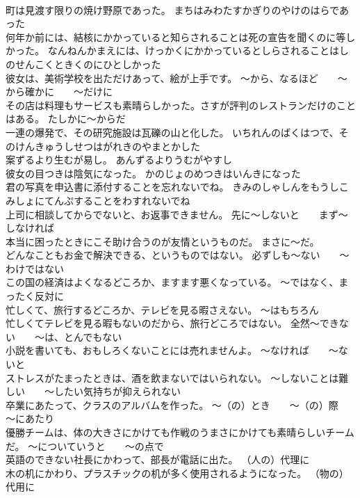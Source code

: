 \documentclass[8pt]{extreport}
\begin{document}
\begin{CJK}{UTF8}{min}
\\	町は見渡す限りの焼け野原であった。	まちはみわたすかぎりのやけのはらであった 
\\	何年か前には、結核にかかっていると知らされることは死の宣告を聞くのに等しかった。	なんねんかまえには、けっかくにかかっているとしらされることはしのせんこくときくのにひとしかった 
\\	彼女は、美術学校を出ただけあって、絵が上手です。	～から、なるほど　　～から確かに　　～だけに
\\	その店は料理もサービスも素晴らしかった。さすが評判のレストランだけのことはある。	たしかに～からだ
\\	一連の爆発で、その研究施設は瓦礫の山と化した。	いちれんのばくはつで、そのけんきゅうしせつはがれきのやまとかした 
\\	案ずるより生むが易し。	あんずるよりうむがやすし 
\\	彼女の目つきは陰気になった。	かのじょのめつきはいんきになった 
\\	君の写真を申込書に添付することを忘れないでね。	きみのしゃしんをもうしこみしょにてんぷすることをわすれないでね 
\\	上司に相談してからでないと、お返事できません。	先に～しないと　　まず～しなければ
\\	本当に困ったときにこそ助け合うのが友情というものだ。	まさに～だ。
\\	どんなこともお金で解決できる、というものではない。	必ずしも～ない　　～わけではない
\\	この国の経済はよくなるどころか、ますます悪くなっている。	～ではなく、まったく反対に
\\	忙しくて、旅行するどころか、テレビを見る暇さえない。	～はもちろん
\\	忙しくてテレビを見る暇もないのだから、旅行どころではない。	全然～できない　　～は、とんでもない
\\	小説を書いても、おもしろくないことには売れませんよ。	～なければ　　～ないと
\\	ストレスがたまったときは、酒を飲まないではいられない。	～しないことは難しい　　～したい気持ちが抑えられない
\\	卒業にあたって、クラスのアルバムを作った。	～（の）とき　　～（の）際　　～にあたり
\\	優勝チームは、体の大きさにかけても作戦のうまさにかけても素晴らしいチームだ。	～についていうと　　～の点で
\\	英語のできない社長にかわって、部長が電話に出た。	（人の）代理に
\\	木の机にかわり、プラスチックの机が多く使用されるようになった。	（物の）代用に

\end{CJK}
\end{document}
